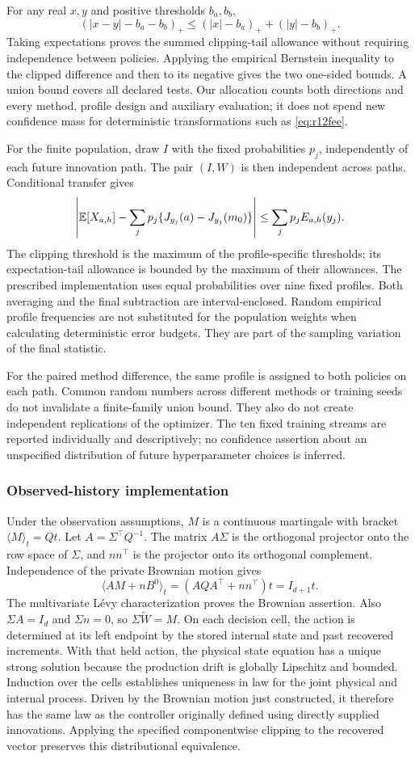 For any real $x,y$ and positive thresholds $b_a,b_b$,
\[
 (|x-y|-b_a-b_b)_+
       \leq (|x|-b_a)_++(|y|-b_b)_+.
\]
Taking expectations proves the summed clipping-tail allowance without requiring independence between policies. Applying the empirical Bernstein inequality to the clipped difference and then to its negative gives the two one-sided bounds. A union bound covers all declared tests. Our allocation counts both directions and every method, profile design and auxiliary evaluation; it does not spend new confidence mass for deterministic transformations such as \eqref{eq:r12fee}.

For the finite population, draw $I$ with the fixed probabilities $p_j$, independently of each future innovation path. The pair $(I,W)$ is then independent across paths. Conditional transfer gives
\[
 \left|\mathbb E[X_{a,h}]-\sum_jp_j\{J_{y_j}(a)-J_{y_j}(m_0)\}\right|
       \leq\sum_jp_j E_{a,h}(y_j).
\]
The clipping threshold is the maximum of the profile-specific thresholds; its expectation-tail allowance is bounded by the maximum of their allowances. The prescribed implementation uses equal probabilities over nine fixed profiles. Both averaging and the final subtraction are interval-enclosed. Random empirical profile frequencies are not substituted for the population weights when calculating deterministic error budgets. They are part of the sampling variation of the final statistic.

For the paired method difference, the same profile is assigned to both policies on each path. Common random numbers across different methods or training seeds do not invalidate a finite-family union bound. They also do not create independent replications of the optimizer. The ten fixed training streams are reported individually and descriptively; no confidence assertion about an unspecified distribution of future hyperparameter choices is inferred.

\subsubsection{Observed-history implementation}
Under the observation assumptions, $M$ is a continuous martingale with bracket $\langle M\rangle_t=Qt$. Let $A=\Sigma^\top Q^{-1}$. The matrix $A\Sigma$ is the orthogonal projector onto the row space of $\Sigma$, and $nn^\top$ is the projector onto its orthogonal complement. Independence of the private Brownian motion gives
\[
 \langle AM+nB^0\rangle_t
       =(AQA^\top+nn^\top)t=I_{d+1}t.
\]
The multivariate L\'evy characterization proves the Brownian assertion. Also $\Sigma A=I_d$ and $\Sigma n=0$, so $\Sigma\widetilde W=M$. On each decision cell, the action is determined at its left endpoint by the stored internal state and past recovered increments. With that held action, the physical state equation has a unique strong solution because the production drift is globally Lipschitz and bounded. Induction over the cells establishes uniqueness in law for the joint physical and internal process. Driven by the Brownian motion just constructed, it therefore has the same law as the controller originally defined using directly supplied innovations. Applying the specified componentwise clipping to the recovered vector preserves this distributional equivalence.

